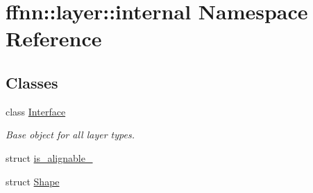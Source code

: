 \hypertarget{namespaceffnn_1_1layer_1_1internal}{\section{ffnn\-:\-:layer\-:\-:internal Namespace Reference}
\label{namespaceffnn_1_1layer_1_1internal}
}
\subsection*{Classes}
\begin{DoxyCompactItemize}
\item 
class \hyperlink{classffnn_1_1layer_1_1internal_1_1_interface}{Interface}
\begin{DoxyCompactList}\small\item\em Base object for all layer types. \end{DoxyCompactList}\item 
struct \hyperlink{structffnn_1_1layer_1_1internal_1_1is__alignable__128}{is\-\_\-alignable\-\_}
\item 
struct \hyperlink{structffnn_1_1layer_1_1internal_1_1_shape}{Shape}
\end{DoxyCompactItemize}
